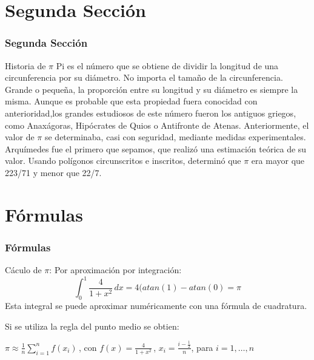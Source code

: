 \documentclass{beamer}
\begin{document}
\section{Segunda Sección}

\begin{frame}

\frametitle{Segunda Sección}

\begin{block}{Historia de $\pi$}
Pi es el número que se obtiene de dividir la longitud de una circunferencia por su diámetro.
No importa el tamaño de la circunferencia. Grande o pequeña, la proporción
entre su longitud y su diámetro es siempre la misma. Aunque es probable que esta propiedad 
fuera conocidad con anterioridad,los grandes estudiosos de este número fueron los
antiguos griegos, como Anaxágoras, Hipócrates de Quios o Antifronte de Atenas. Anteriormente, 
el valor de $\pi$ se determinaba, casi con seguridad, mediante medidas
experimentales. Arquímedes fue el primero que sepamos, que realizó una estimación teórica de su valor. 
Usando polígonos circunscritos e inscritos, determinó que $\pi$
era mayor que 223/71 y menor que 22/7.

\end{block}

\end{frame}
\section{Fórmulas}
\begin{frame}

\frametitle{Fórmulas}

\begin{block}{Cáculo de $\pi$:}
Por aproximación por integración:
$$\int_{0}^{1} \! \frac{4}{1+x^2}\, dx = 4(atan(1) -atan(0) = \pi $$
Esta integral se puede aproximar numéricamente con una fórmula de cuadratura.

Si se utiliza la regla del punto medio se obtien:

$ \pi \approx \frac{1}{n} \sum\limits_{i=1}^{n}f(x_i)\,$,
 con $f(x) = \frac{4}{1+x^2}\,$,
 $x_i = \frac{i - \frac{1}{2}}{n}$,
 para $i = 1, \dots, n$

\end{block}

\end{frame}
\end{document}
